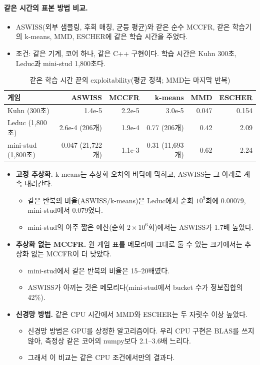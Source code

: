 \paragraph{같은 시간의 표본 방법 비교.}
\begin{itemize}
  \item ASWISS(외부 샘플링, 후회 매칭, 균등 평균)와 같은 순수 MCCFR, 같은 학습기의 k-means, MMD, ESCHER에 같은 학습 시간을 주었다.
  \item 조건: 같은 기계, 코어 하나, 같은 C++ 구현이다. 학습 시간은 Kuhn 300초, Leduc과 mini-stud 1,800초다.
\end{itemize}
\begin{table}[h]
\centering\small
\caption{같은 학습 시간 끝의 exploitability(평균 정책; MMD는 마지막 반복)}\label{tab:walltime}
\begin{tabular}{@{}lrrrrr@{}}
\toprule
게임 & ASWISS & MCCFR & k-means & MMD & ESCHER \\
\midrule
Kuhn (300초) & 1.4e-5 & 2.2e-5 & 3.0e-5 & 0.047 & 0.154 \\
Leduc (1,800초) & 2.6e-4 (206개) & 1.9e-4 & 0.77 (206개) & 0.42 & 2.09 \\
mini-stud (1,800초) & 0.047 (21,722개) & 1.1e-3 & 0.31 (11,693개) & 0.62 & 2.24 \\
\bottomrule
\end{tabular}
\end{table}
\begin{itemize}
  \item \textbf{고정 추상화.} k-means는 추상화 오차의 바닥에 막히고, ASWISS는 그 아래로 계속 내려간다.
    \begin{itemize}
      \item 같은 반복의 비율(ASWISS/k-means)은 Leduc에서 순회 $10^9$회에 0.00079, mini-stud에서 0.079였다.
      \item mini-stud의 아주 짧은 예산(순회 $2\times10^6$회)에서는 ASWISS가 1.7배 높았다.
    \end{itemize}
  \item \textbf{추상화 없는 MCCFR.} 원 게임 표를 메모리에 그대로 둘 수 있는 크기에서는 추상화 없는 MCCFR이 더 낮았다.
    \begin{itemize}
      \item mini-stud에서 같은 반복의 비율은 15–20배였다.
      \item ASWISS가 아끼는 것은 메모리다(mini-stud에서 bucket 수가 정보집합의 42\%).
    \end{itemize}
  \item \textbf{신경망 방법.} 같은 CPU 시간에서 MMD와 ESCHER는 두 자릿수 이상 높았다.
    \begin{itemize}
      \item 신경망 방법은 GPU를 상정한 알고리즘이다. 우리 CPU 구현은 BLAS를 쓰지 않아, 측정상 같은 코어의 numpy보다 2.1–3.6배 느리다.
      \item 그래서 이 비교는 같은 CPU 조건에서만의 결과다.
    \end{itemize}
\end{itemize}

